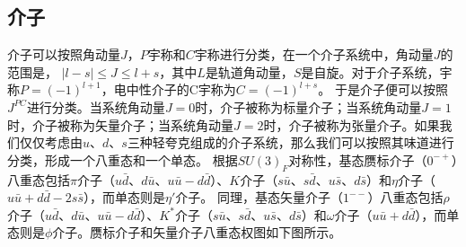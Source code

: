 \subsection{介子}
介子可以按照角动量$J$，$P$宇称和$C$宇称进行分类，在一个介子系统中，角动量$J$的范围是， $|l-s|\leq J \leq l+s$，其中$L$是轨道角动量，$S$是自旋。对于介子系统，宇称$P=(-1)^{l+1}$，电中性介子的C宇称为$C=(-1)^{l+s}$。
于是介子便可以按照$J^{PC}$进行分类。当系统角动量$J=0$时，介子被称为标量介子；当系统角动量$J=1$时，介子被称为矢量介子；当系统角动量$J=2$时，介子被称为张量介子。如果我们仅仅考虑由$u$、$d$、$s$三种轻夸克组成的介子系统，那么我们可以按照其味道进行分类，形成一个八重态和一个单态。
根据$SU(3)_F$对称性，基态赝标介子（$0^{-+}$）八重态包括$\pi$介子（$u\bar{d}$、$d\bar{u}$、$u\bar{u}-d\bar{d}$）、$K$介子（$s\bar{u}$、$s\bar{d}$、$u\bar{s}$、$d\bar{s}$）和$\eta$介子（$u\bar{u}+d\bar{d}-2s\bar{s}$），而单态则是$\eta'$介子。
同理，基态矢量介子（$1^{--}$）八重态包括$\rho$介子（$u\bar{d}$、$d\bar{u}$、$u\bar{u}-d\bar{d}$）、$K^*$介子（$s\bar{u}$、$s\bar{d}$、$u\bar{s}$、$d\bar{s}$）和$\omega$介子（$u\bar{u}+d\bar{d}$），而单态则是$\phi$介子。赝标介子和矢量介子八重态权图如下图所示。\\


\begin{table}[!htbp]
\centering
\small
\setlength{\tabcolsep}{10pt}
\renewcommand{\arraystretch}{1.25}
\caption{夸克和轻子的代结构（按电荷类型与代排列）。}
\label{tab:gen_quark_lepton}

\end{table}

